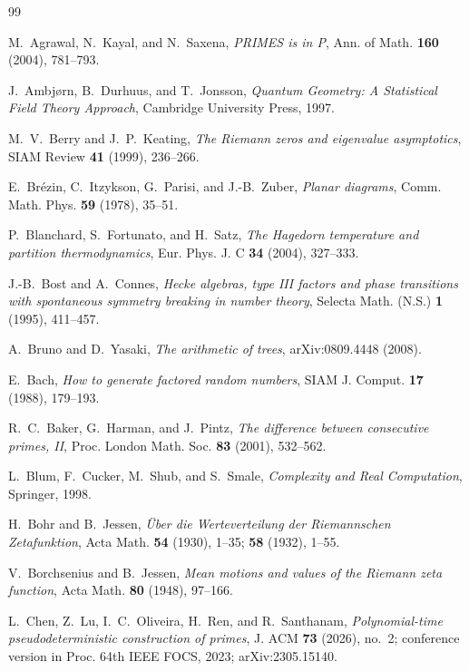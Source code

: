 \documentclass[11pt]{article}
\numberwithin{equation}{section}
\theoremstyle{plain}
\theoremstyle{definition}
\theoremstyle{remark}
\begin{document}
\begin{thebibliography}{99}

M.~Agrawal, N.~Kayal, and N.~Saxena,
\emph{PRIMES is in P},
Ann. of Math. \textbf{160} (2004), 781--793.

J.~Ambj\o rn, B.~Durhuus, and T.~Jonsson,
\emph{Quantum Geometry: A Statistical Field Theory Approach},
Cambridge University Press, 1997.

M.~V.~Berry and J.~P.~Keating,
\emph{The Riemann zeros and eigenvalue asymptotics},
SIAM Review \textbf{41} (1999), 236--266.

E.~Br\'ezin, C.~Itzykson, G.~Parisi, and J.-B.~Zuber,
\emph{Planar diagrams},
Comm. Math. Phys. \textbf{59} (1978), 35--51.

P.~Blanchard, S.~Fortunato, and H.~Satz,
\emph{The Hagedorn temperature and partition thermodynamics},
Eur. Phys. J. C \textbf{34} (2004), 327--333.

J.-B.~Bost and A.~Connes,
\emph{Hecke algebras, type III factors and phase transitions with spontaneous symmetry
breaking in number theory},
Selecta Math. (N.S.) \textbf{1} (1995), 411--457.

A.~Bruno and D.~Yasaki,
\emph{The arithmetic of trees},
arXiv:0809.4448 (2008).

E.~Bach,
\emph{How to generate factored random numbers},
SIAM J. Comput. \textbf{17} (1988), 179--193.

R.~C.~Baker, G.~Harman, and J.~Pintz,
\emph{The difference between consecutive primes, II},
Proc. London Math. Soc. \textbf{83} (2001), 532--562.

L.~Blum, F.~Cucker, M.~Shub, and S.~Smale,
\emph{Complexity and Real Computation},
Springer, 1998.

H.~Bohr and B.~Jessen,
\emph{\"Uber die Werteverteilung der Riemannschen Zetafunktion},
Acta Math. \textbf{54} (1930), 1--35; \textbf{58} (1932), 1--55.

V.~Borchsenius and B.~Jessen,
\emph{Mean motions and values of the Riemann zeta function},
Acta Math. \textbf{80} (1948), 97--166.

L.~Chen, Z.~Lu, I.~C.~Oliveira, H.~Ren, and R.~Santhanam,
\emph{Polynomial-time pseudodeterministic construction of primes},
J. ACM \textbf{73} (2026), no.~2; conference version in Proc. 64th IEEE FOCS, 2023;
arXiv:2305.15140.


\end{thebibliography}
\end{document}
